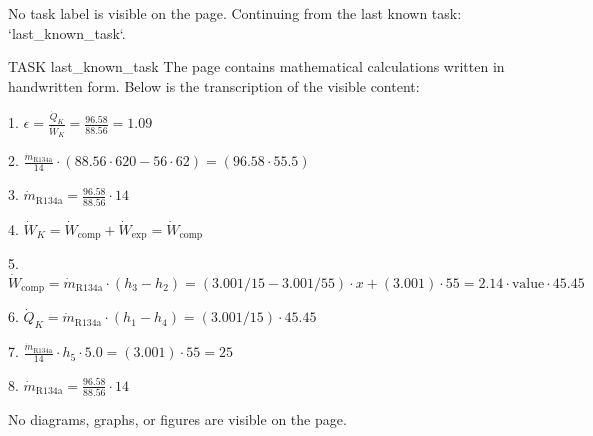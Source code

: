No task label is visible on the page. Continuing from the last known task: `{last_known_task}`.

TASK {last_known_task}
The page contains mathematical calculations written in handwritten form. Below is the transcription of the visible content:

1. \( \epsilon = \frac{\dot{Q}_K}{\dot{W}_K} = \frac{96.58}{88.56} = 1.09 \)

2. \( \frac{\dot{m}_{\text{R134a}}}{14} \cdot (88.56 \cdot 620 - 56 \cdot 62) = (96.58 \cdot 55.5) \)

3. \( \dot{m}_{\text{R134a}} = \frac{96.58}{88.56} \cdot 14 \)

4. \( \dot{W}_K = \dot{W}_\text{comp} + \dot{W}_\text{exp} = \dot{W}_\text{comp} \)

5. \( \dot{W}_\text{comp} = \dot{m}_{\text{R134a}} \cdot (h_3 - h_2) = (3.001/15 - 3.001/55) \cdot x + (3.001) \cdot 55 = 2.14 \cdot \text{value} \cdot 45.45 \)

6. \( \dot{Q}_K = \dot{m}_{\text{R134a}} \cdot (h_1 - h_4) = (3.001/15) \cdot 45.45 \)

7. \( \frac{\dot{m}_{\text{R134a}}}{14} \cdot h_5 \cdot 5.0 = (3.001) \cdot 55 = 25 \)

8. \( \dot{m}_{\text{R134a}} = \frac{96.58}{88.56} \cdot 14 \)

No diagrams, graphs, or figures are visible on the page.